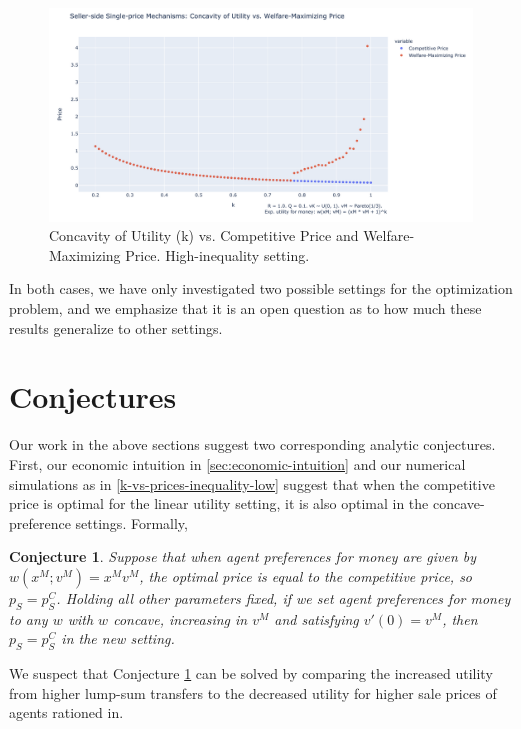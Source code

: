 \documentclass[AER]{AEA}
\newtheorem{conj}[theorem]{Conjecture}
\begin{document}
\begin{figure}
    \label{k-vs-prices-inequality-high}
    \includegraphics[width=\textwidth]{figures/k-vs-prices-inequality-high.png}
    \caption{Concavity of Utility (k) vs. Competitive Price and Welfare-Maximizing Price. High-inequality setting.}
\end{figure}

In both cases, we have only investigated two possible settings for the optimization problem, and we emphasize that it is an open question as to how much these results generalize to other settings.

\section{Conjectures}
\label{sec:conjectures}

Our work in the above sections suggest two corresponding analytic conjectures. First, our economic intuition in \ref{sec:economic-intuition} and our numerical simulations as in \ref{k-vs-prices-inequality-low} suggest that when the competitive price is optimal for the linear utility setting, it is also optimal in the concave-preference settings. Formally,

\begin{conj}
    \label{conj:competitive-price}
    Suppose that when agent preferences for money are given by $w(x^M; v^M) = x^M v^M$, the optimal price is equal to the competitive price, so $p_S = p_S^C$. Holding all other parameters fixed, if we set agent preferences for money to any $w$ with $w$ concave, increasing in $v^M$ and satisfying $v'(0) = v^M$, then $p_S = p_S^C$ in the new setting.
\end{conj}

We suspect that Conjecture \ref{conj:competitive-price} can be solved by comparing the increased utility from higher lump-sum transfers to the decreased utility for higher sale prices of agents rationed in.
\end{document}
